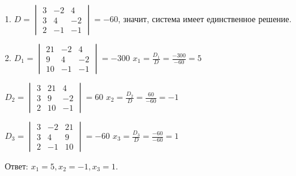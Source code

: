 \documentclass[12pt,a4paper]{article}
\begin{document}
1. $D = \begin{vmatrix}
3& -2& 4 \\
3& 4& -2 \\
2& -1& -1
\end{vmatrix} = -60$, значит, система имеет единственное решение. 

2. $D_{1} = \begin{vmatrix}
21& -2& 4 \\
9& 4& -2 \\
10& -1& -1
\end{vmatrix} = -300$ 
$x_{1} = \frac{D_{1}}{D} = \frac{-300}{-60} = 5$ 

$D_{2} = \begin{vmatrix}
3& 21& 4 \\
3& 9& -2 \\
2& 10& -1
\end{vmatrix} = 60$ 
$x_{2} = \frac{D_{2}}{D} = \frac{60}{-60} = -1$ 

$D_{3} = \begin{vmatrix}
3& -2& 21 \\
3& 4& 9 \\
2& -1& 10
\end{vmatrix} = -60$ 
$x_{3} = \frac{D_{3}}{D} = \frac{-60}{-60} = 1$ 

Ответ: $x_{1} = 5, x_{2} = -1, x_{3} = 1$.
\end{document}
